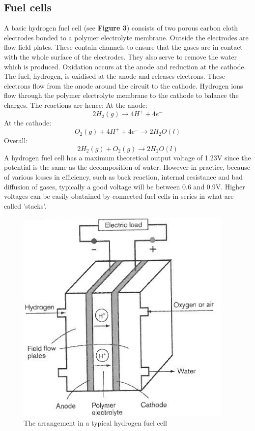 \documentclass{article}
\begin{document}
    \subsection{Fuel cells}
    A basic hydrogen fuel cell (see \textbf{Figure 3}) consists of two porous carbon cloth electrodes bonded to a polymer electrolyte membrane. 
    Outside the electrodes are flow field plates. These contain channels to ensure that the gases are in contact with the whole surface 
    of the electrodes. They also serve to remove the water which is produced.
    \newline Oxidation occurs at the anode and reduction at the cathode. The fuel, hydrogen, is oxidised at the anode 
    and releases electrons. These electrons flow from the anode around the circuit to the cathode. Hydrogen ions flow through 
    the polymer electrolyte membrane to the cathode to balance the charges. \cite{ETH}
    \newline The reactions are hence:
    \newline At the anode: \cite{ETH}
    \begin{equation}
        2H_2(g) \rightarrow 4H^+ + 4e^-
    \end{equation}
    At the cathode: \cite{ETH}
    \begin{equation}
        O_2(g) + 4H^+ + 4e^- \rightarrow 2H_2O(l)
    \end{equation}
    Overall: \cite{ETH}
    \begin{equation}
        2H_2(g) + O_2(g) \rightarrow 2H_2O(l)
    \end{equation}
    A hydrogen fuel cell has a maximum theoretical output voltage of 1.23V since the potential is the same as the decomposition of water. However 
    in practice, because of various losses in efficiency, such as back reaction, internal resistance and bad diffusion of gases, typically a good voltage 
    will be between 0.6 and 0.9V.
    \newline Higher voltages can be easily obatained by connected fuel cells in series in what are called 'stacks'.
    \begin{figure}
        \centering
        \includegraphics[scale=0.4]{./fuel.png}
        \caption{The arrangement in a typical hydrogen fuel cell \cite{ETH}}
    \end{figure}
\end{document}
